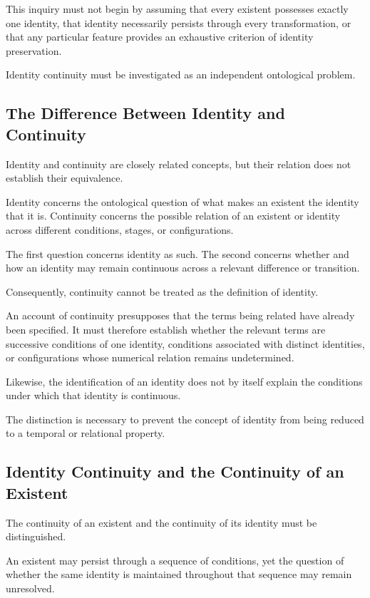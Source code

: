 This inquiry must not begin by assuming that every
existent possesses exactly one identity, that identity
necessarily persists through every transformation,
or that any particular feature provides an exhaustive
criterion of identity preservation.

Identity continuity must be investigated as an
independent ontological problem.

\subsection{The Difference Between Identity and Continuity}

Identity and continuity are closely related concepts,
but their relation does not establish their equivalence.

Identity concerns the ontological question of what
makes an existent the identity that it is. Continuity
concerns the possible relation of an existent or
identity across different conditions, stages, or
configurations.

The first question concerns identity as such. The
second concerns whether and how an identity may
remain continuous across a relevant difference
or transition.

Consequently, continuity cannot be treated as the
definition of identity.

An account of continuity presupposes that the terms
being related have already been specified. It must
therefore establish whether the relevant terms are
successive conditions of one identity, conditions
associated with distinct identities, or configurations
whose numerical relation remains undetermined.

Likewise, the identification of an identity does
not by itself explain the conditions under which
that identity is continuous.

The distinction is necessary to prevent the concept
of identity from being reduced to a temporal or
relational property.

\subsection{Identity Continuity and the Continuity of an Existent}

The continuity of an existent and the continuity
of its identity must be distinguished.

An existent may persist through a sequence of
conditions, yet the question of whether the same
identity is maintained throughout that sequence
may remain unresolved.

